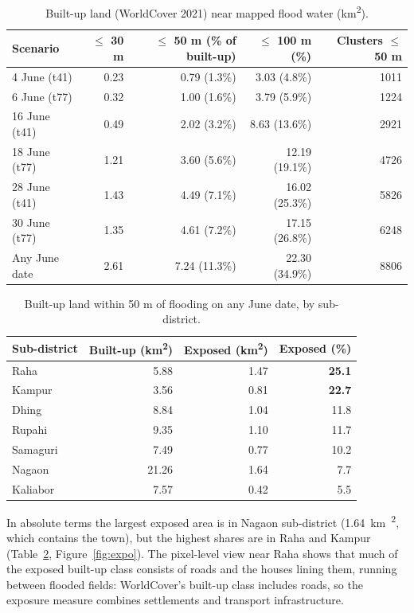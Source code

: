 \documentclass[11pt,a4paper]{article}
\newcommand{\kmsq}{km\textsuperscript{2}}
\begin{document}
\begin{table}[H]
\centering\small
\caption{Built-up land (WorldCover 2021) near mapped flood water (\kmsq).}
\label{tab:expo}
\begin{tabular}{lrrrr}
\toprule
Scenario & $\leq$ 30 m & $\leq$ 50 m (\% of built-up) & $\leq$ 100 m (\%) & Clusters $\leq$ 50 m\\
\midrule
4 June (t41) & 0.23 & 0.79 (1.3\%) & 3.03 (4.8\%) & \num{1011}\\
6 June (t77) & 0.32 & 1.00 (1.6\%) & 3.79 (5.9\%) & \num{1224}\\
16 June (t41) & 0.49 & 2.02 (3.2\%) & 8.63 (13.6\%) & \num{2921}\\
18 June (t77) & 1.21 & 3.60 (5.6\%) & 12.19 (19.1\%) & \num{4726}\\
28 June (t41) & 1.43 & 4.49 (7.1\%) & 16.02 (25.3\%) & \num{5826}\\
30 June (t77) & 1.35 & 4.61 (7.2\%) & 17.15 (26.8\%) & \num{6248}\\
\midrule
Any June date & 2.61 & 7.24 (11.3\%) & 22.30 (34.9\%) & \num{8806}\\
\bottomrule
\end{tabular}
\end{table}

\begin{table}[H]
\centering\small
\caption{Built-up land within 50 m of flooding on any June date, by sub-district.}
\label{tab:exposub}
\begin{tabular}{lrrr}
\toprule
Sub-district & Built-up (\kmsq) & Exposed (\kmsq) & Exposed (\%)\\
\midrule
Raha & 5.88 & 1.47 & \textbf{25.1}\\
Kampur & 3.56 & 0.81 & \textbf{22.7}\\
Dhing & 8.84 & 1.04 & 11.8\\
Rupahi & 9.35 & 1.10 & 11.7\\
Samaguri & 7.49 & 0.77 & 10.2\\
Nagaon & 21.26 & 1.64 & 7.7\\
Kaliabor & 7.57 & 0.42 & 5.5\\
\bottomrule
\end{tabular}
\end{table}

In absolute terms the largest exposed area is in Nagaon sub-district (\SI{1.64}{\kmsq}, which contains the town),
but the highest shares are in Raha and Kampur (Table~\ref{tab:exposub}, Figure~\ref{fig:expo}). The pixel-level view
near Raha shows that much of the exposed built-up class consists of roads and the houses lining them, running between
flooded fields: WorldCover's built-up class includes roads, so the exposure measure combines settlements and
transport infrastructure.
\end{document}
